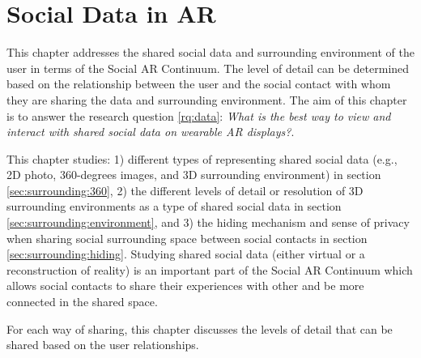 \chapter{Social Data in AR} 
\label{ch:data} 

This chapter addresses the shared social data and surrounding environment of the user in terms of the Social AR Continuum. The level of detail can be determined based on the relationship between the user and the social contact with whom they are sharing the data and surrounding environment. The aim of this chapter is to answer the research question \ref{rq:data}: \textit{What is the best way to view and interact with shared social data on wearable AR displays?}. 



This chapter studies: 1) different types of representing shared social data (e.g., 2D photo, 360-degrees images, and 3D surrounding environment) in section \ref{sec:surrounding:360}, 2) the different levels of detail or resolution of 3D surrounding environments as a type of shared social data in section \ref{sec:surrounding:environment}, and 3) the hiding mechanism and sense of privacy when sharing social surrounding space between social contacts in section \ref{sec:surrounding:hiding}. Studying shared social data (either virtual or a reconstruction of reality) is an important part of the Social AR Continuum which allows social contacts to share their experiences with other and be more connected in the shared space. 


For each way of sharing, this chapter discusses the levels of detail that can be shared based on the user relationships. 





